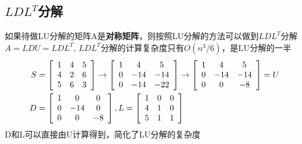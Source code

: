 \documentclass{book}
\begin{document}
\subsection{$LDL^T$分解}
如果待做LU分解的矩阵A是\textbf{对称矩阵}，则按照LU分解的方法可以做到$LDL^T$分解\\
$A=LDU=LDL^T$, $LDL^T$分解的计算复杂度只有$O(n^3/6)$，是LU分解的一半 
\begin{equation*}
 \begin{aligned}
 S&=\left[
  \begin{array}{c c c}
    1 & 4 &5\\ 
    4 & 2 &6\\ 
    5 & 6 &3 
  \end{array}
 \right]\rightarrow
   \left[
    \begin{array}{c c c}
      1 & 4 &5\\ 
      0 & -14 & -14\\ 
      0 & -14 & -22
    \end{array}
   \right]\rightarrow
    \left[
      \begin{array}{c c c}
      1 & 4 &5\\ 
      0 & -14 & -14\\ 
      0 & 0 & -8 
      \end{array}
    \right]=U\\ 
  D&=\left[
    \begin{array}{c c c }
      1 & 0 & 0\\ 
      0 & -14&0\\ 
      0 & 0 &-8
    \end{array}
  \right], 
  L=\left[
    \begin{array}{c c c }
      1 & 0 & 0\\ 
      4 & 1 & 0\\ 
      5 & 1 & 1
    \end{array}
  \right]
 \end{aligned} 
\end{equation*}
D和L可以直接由U计算得到，简化了LU分解的复杂度
\end{document}

